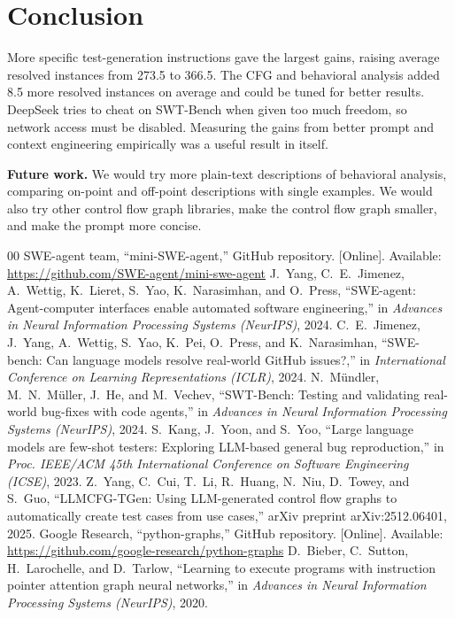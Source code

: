 \documentclass[conference]{IEEEtran}
\begin{document}
\section{Conclusion}
\label{sec:conclusion}
More specific test-generation instructions gave the largest gains, raising average resolved instances from 273.5 to 366.5. The CFG and behavioral analysis added 8.5 more resolved instances on average and could be tuned for better results. DeepSeek tries to cheat on SWT-Bench when given too much freedom, so network access must be disabled. Measuring the gains from better prompt and context engineering empirically was a useful result in itself.

\textbf{Future work.} We would try more plain-text descriptions of behavioral analysis, comparing on-point and off-point descriptions with single examples. We would also try other control flow graph libraries, make the control flow graph smaller, and make the prompt more concise.

\begin{thebibliography}{00}
 SWE-agent team, ``mini-SWE-agent,'' GitHub repository. [Online]. Available: \url{https://github.com/SWE-agent/mini-swe-agent}
 J.~Yang, C.~E.~Jimenez, A.~Wettig, K.~Lieret, S.~Yao, K.~Narasimhan, and O.~Press, ``SWE-agent: Agent-computer interfaces enable automated software engineering,'' in \emph{Advances in Neural Information Processing Systems (NeurIPS)}, 2024.
 C.~E.~Jimenez, J.~Yang, A.~Wettig, S.~Yao, K.~Pei, O.~Press, and K.~Narasimhan, ``SWE-bench: Can language models resolve real-world GitHub issues?,'' in \emph{International Conference on Learning Representations (ICLR)}, 2024.
 N.~M\"undler, M.~N.~M\"uller, J.~He, and M.~Vechev, ``SWT-Bench: Testing and validating real-world bug-fixes with code agents,'' in \emph{Advances in Neural Information Processing Systems (NeurIPS)}, 2024.
 S.~Kang, J.~Yoon, and S.~Yoo, ``Large language models are few-shot testers: Exploring LLM-based general bug reproduction,'' in \emph{Proc. IEEE/ACM 45th International Conference on Software Engineering (ICSE)}, 2023.
 Z.~Yang, C.~Cui, T.~Li, R.~Huang, N.~Niu, D.~Towey, and S.~Guo, ``LLMCFG-TGen: Using LLM-generated control flow graphs to automatically create test cases from use cases,'' arXiv preprint arXiv:2512.06401, 2025.
 Google Research, ``python-graphs,'' GitHub repository. [Online]. Available: \url{https://github.com/google-research/python-graphs}
 D.~Bieber, C.~Sutton, H.~Larochelle, and D.~Tarlow, ``Learning to execute programs with instruction pointer attention graph neural networks,'' in \emph{Advances in Neural Information Processing Systems (NeurIPS)}, 2020.
\end{thebibliography}
\end{document}
